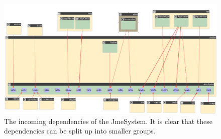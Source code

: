 \documentclass[a4paper, 10pt]{article}
\begin{document}
\begin{figure}[!hb]
\hspace*{-20mm}
\includegraphics[width=1.3\textwidth]{figures/jme-system-deps.png}
\caption{The incoming dependencies of the JmeSystem. It is clear that these dependencies can be split up into smaller groups.}
\label{fig:system-incoming}
\end{figure}
\end{document}
